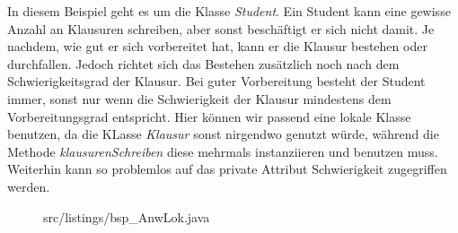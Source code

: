 In diesem Beispiel geht es um die Klasse {\it Student}.
Ein Student kann eine gewisse Anzahl an Klausuren schreiben, aber sonst beschäftigt er sich nicht damit.
Je nachdem, wie gut er sich vorbereitet hat, kann er die Klausur bestehen oder durchfallen.
Jedoch richtet sich das Bestehen zusätzlich noch nach dem Schwierigkeitsgrad der Klausur.
Bei guter Vorbereitung besteht der Student immer, sonst nur wenn die  Schwierigkeit der Klausur mindestens dem Vorbereitungsgrad entspricht.
Hier können wir passend eine lokale Klasse benutzen, da die KLasse {\it Klausur} sonst nirgendwo genutzt würde, während die Methode {\it klausurenSchreiben} diese mehrmals instanziieren und benutzen muss.
Weiterhin kann so problemlos auf das private Attribut Schwierigkeit zugegriffen werden.
\\
\begin{figure}[ht]
\lstset{language=Java}
 {src/listings/bsp_AnwLok.java}
\end{figure}
